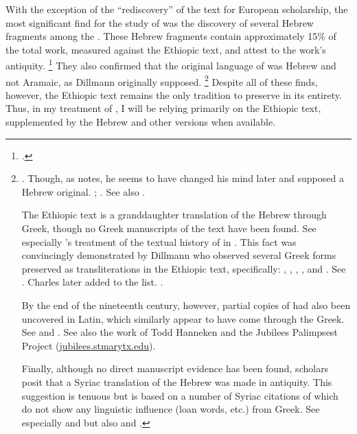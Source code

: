 With the exception of the ``rediscovery'' of the text for European scholarship, the most significant find for the study of \jub was the discovery of several Hebrew fragments among the \dss. These Hebrew fragments contain approximately 15\% of the total work, measured against the Ethiopic text, and attest to the work's antiquity.%
    \footnote{%
        \Cite[124]{stokl_henoch2006}.}
They also confirmed that the original language of \jub was Hebrew and not Aramaic, as Dillmann originally supposed.%
        \footnote{%
            \Cite[90]{dillamnn_jbw1850}. Though, as \vanderkam notes, he seems to have changed his mind later and supposed a Hebrew original. 
            \cite[324]{dillmann_spaw1883}; 
            \cite[1:1 n. 1]{vanderkam2018}. See also 
            \cite{weitzman_jaos1999}.

        The Ethiopic text is a granddaughter translation of the Hebrew through Greek, though no Greek manuscripts of the text have been found. See especially \vanderkam's treatment of the textual history of \jub in 
        \cite*[1--18]{vanderkam1977}. This fact was convincingly demonstrated by Dillmann who observed several Greek forms preserved as transliterations in the Ethiopic text, specifically: , , , , and . See 
        \cite[88]{dillamnn_jbw1850}. Charles later added  to the list. 
        \cite[xxx]{charles1902}.

        By the end of the nineteenth century, however, partial copies of \jub had also been uncovered in Latin, which similarly appear to have come through the Greek.
        See
                \cite[15--54]{ceriani1861} and
                \cite{ronsch1874}.
        See also the work of Todd Hanneken and the Jubilees Palimpsest Project (\href{http://jubilees.stmarytx.edu}{jubilees.stmarytx.edu}).

        Finally, although no direct manuscript evidence has been found, \jub scholars posit that a Syriac translation of the Hebrew was made in antiquity. This suggestion is tenuous but is based on a number of Syriac citations of \jub which do not show any linguistic influence (loan words, etc.) from Greek.
        See especially
                \cite[231--232]{tisserant_rb1921} and 
                \cite[xxix]{charles1902} but also 
                \cite[2:ix--x]{ceriani1861} and 
                \cite[x]{charles1895}.}
Despite all of these finds, however, the Ethiopic text remains the only tradition to preserve \jub in its entirety. Thus, in my treatment of \jub, I will be relying primarily on the Ethiopic text, supplemented by the Hebrew and other versions when available.

